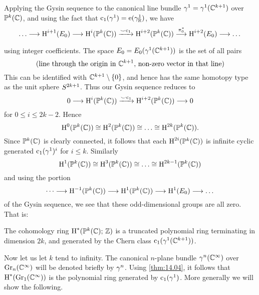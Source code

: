 \documentclass[../main]{subfiles}
\begin{document}
Applying the Gysin sequence to the canonical line bundle $\gamma^{1}= \gamma^{1}(\mathbb C^{k+1})$ over $\mathbb{P}^k(\mathbb C)$, and using the fact that $\operatorname{c}_{1}(\gamma^{1})=\operatorname{e}(\gamma_{\mathbb R}^{1})$, we have
\[
\dots \varrightarrow{} \homology^{i+1}(\total_0) \varrightarrow{} \homology^i(\projective^k(\bC)) \varrightarrow{\smile \chernclass_1} \homology^{i+2}(\projective^k(\bC)) \varrightarrow{\pi_0^\ast} \homology^{i+2}(\total_0) \varrightarrow{} \dots
\]
using integer coefficients. The space $E_0 = E_0(\gamma^1(\mathbb C^{k+1}))$ is the set of all pairs 
\[
(\text{line through the origin in }\mathbb C^{k+1}, \,\text{non-zero vector in that line})
\]
This can be identified with $\mathbb C^{k+1}\setminus \{0\}$, and hence has the same homotopy type as the unit sphere $S^{2k+1}$. Thus our Gysin sequence reduces to
\[
0 \longrightarrow \homology^i(\projective^k(\bC)) \varrightarrow{\smile \chernclass_1} \homology^{i+2}(\projective^k(\bC)) \longrightarrow 0
\]
for $0\leq i \leq 2k-2$. Hence
\[
\operatorname{H}^0(\mathbb{P}^k(\mathbb C)) \cong \operatorname{H}^{2}(\mathbb{P}^k(\mathbb C)) \cong \dots \cong \operatorname{H}^{2k}(\mathbb{P}^k(\mathbb C)).
\]
Since $\mathbb{P}^k(\mathbb C)$ is clearly connected, it follows that each $\operatorname{H}^{2i}(\mathbb{P}^k(\mathbb C))$ is infinite cyclic generated $\operatorname{c}_1(\gamma^1)^i$ for $i\le k$. Similarly
\[
\operatorname{H}^1(\mathbb{P}^k(\mathbb C)) \cong \operatorname{H}^3(\mathbb{P}^k(\mathbb C)) \cong \dots \cong \operatorname{H}^{2k-1}(\mathbb{P}^k(\mathbb C))
\]
and using the portion
\[
\dots \longrightarrow \operatorname{H}^{-1}(\mathbb{P}^k(\mathbb C)) \longrightarrow \operatorname{H}^{1}(\mathbb{P}^k(\mathbb C)) \longrightarrow \operatorname{H}^{1}(E_0) \longrightarrow \dots 
\]
of the Gysin sequence, we see that these odd-dimensional groups are all zero. That is:

\begin{theorem}
\label{thm:14.04}
The cohomology ring $\operatorname{H}^\ast(\mathbb{P}^k(\mathbb C);\, \mathbb{Z})$ is a truncated polynomial ring terminating in dimension $2k$, and generated by the Chern class $\operatorname{c}_1(\gamma^1(\mathbb C^{k+1}))$.
\end{theorem}

Now let us let $k$ tend to infinity. The canonical $n$-plane bundle $\gamma^n(\mathbb C^\infty)$ over $\operatorname{Gr}_{n}(\mathbb C^\infty)$ will be denoted briefly by $\gamma^n$. Using \ref{thm:14.04}, it follows that $\operatorname{H}^\ast(\operatorname{Gr}_{1}(\mathbb C^\infty))$ is the polynomial ring generated by $\operatorname{c}_1(\gamma^1)$. More generally we will show the following.
\end{document}
